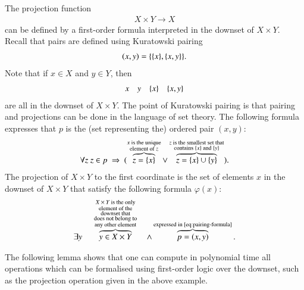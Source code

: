  \begin{myexample}\label{ex:set-structure-projection} The projection function 
	\begin{align*}
		X \times Y \to X
	\end{align*}
	can be defined by a first-order formula interpreted in the downset of $X \times Y$. Recall that pairs 
	are defined using Kuratowski pairing
	\begin{align*}
		(x,y) = \{ \{x\}, \{x,y\}\}.
	\end{align*}
	Note that if $x \in X$ and $y \in Y$, then 
	\begin{align*}
		x \quad y \quad \{x\} \quad \{x,y\}
	\end{align*}
	are all in the  downset of $X \times Y$. 
	The point of Kuratowski pairing is that pairing and projections can be done in the language of set theory. The following formula expresses that $p$ is the (set representing the) ordered pair $(x,y)$:
	\begin{align}\label{eq:pairing-formula}
		\forall z \ z \in p \ \Rightarrow \ (\overbrace{z = \{x\}}^{\substack{\text{$x$ is the unique}\\\text{element of $z$}}} \lor \overbrace{z = \{x\} \cup \{y\}}^{\substack{\text{$z$ is the smallest set that}\\\text{contains $\{x\}$ and $\{y\}$}}}).
	\end{align}
	The projection of $X \times Y$ to the first coordinate is the set of elements $x$ in the downset of $X \times Y$ that satisfy the following formula $\varphi(x)$:
	\begin{align}\label{eq:projection-formula}
		\exists y \quad \ \overbrace{y \in X \times Y}^{\substack{\text{$X \times Y$ is the only}\\ \text{element of the} \\ \text{downset that} \\ \text{does not belong to} \\ \text{any other element}}}\quad \land \overbrace{p = (x,y)}^{\text{expressed in~\eqref{eq:pairing-formula}}}.
	\end{align}
	\end{myexample}
	

The following lemma shows that   one can compute in polynomial time all operations which can be formalised using first-order logic over the downset, such as the projection operation given in the above example. 

